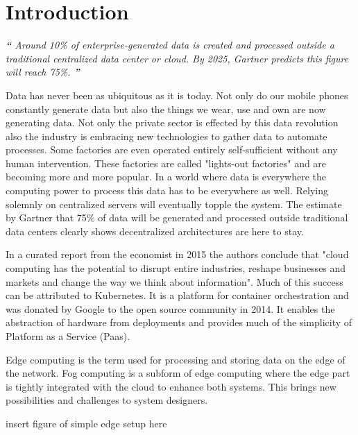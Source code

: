 \section{Introduction}
\begin{displayquote}
\textit{\textbf{\Huge{``}}
\large{Around 10\% of enterprise-generated data is created and processed outside a traditional centralized data center or cloud. By 2025, Gartner predicts this figure will reach 75\%.\cite{gartnerEdgeComputing:online}}
\textbf{\Huge{''}}}
\\[1pt]
\end{displayquote}
Data has never been as ubiquitous as it is today. Not only do our mobile phones constantly generate data but also the things we wear, use and own are now generating data. Not only the private sector is effected by this data revolution also the industry is embracing new technologies to gather data to automate processes. Some factories are even operated entirely self-sufficient without any human intervention. These factories are called "lights-out factories" and are becoming more and more popular\cite{wheresmyRobotLightsOut33:online}. In a world where data is everywhere the computing power to process this data has to be everywhere as well. Relying solemnly on centralized servers will eventually topple the system. The estimate by Gartner that 75\% of data will be generated and processed outside traditional data centers clearly shows decentralized architectures are here to stay.

In a curated report from the economist in 2015 the authors conclude that "cloud computing has the potential to disrupt entire industries, reshape businesses and markets and change the way we think about information"\cite{PuttogetEconomistCloud13:online}. Much of this success can be attributed to Kubernetes. It is a platform for container orchestration and was donated by Google to the open source community in 2014\cite{WhatisKubernetes87:online}. It enables the abstraction of hardware from deployments and provides much of the simplicity of Platform as a Service (Paas)\cite{WhatisKubernetes87:online}.

Edge computing is the term used for processing and storing data on the edge of the network. Fog computing is a subform of edge computing where the edge part is tightly integrated with the cloud to enhance both systems. This brings new possibilities and challenges to system designers.

{\LARGE{insert figure of simple edge setup here}}

